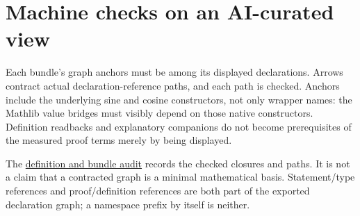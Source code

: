 \section{Machine checks on an AI-curated view}
Each bundle's graph anchors must be among its displayed declarations. Arrows
contract actual declaration-reference paths, and each path is checked.
Anchors include the underlying sine and cosine constructors, not only wrapper
names: the Mathlib value bridges must visibly depend on those native
constructors. Definition readbacks and explanatory companions do not become
prerequisites of the measured proof terms merely by being displayed.

The \href{three-proofs/definition-audit.json}{definition and bundle audit}
records the checked closures and paths. It is not a claim that a contracted
graph is a minimal mathematical basis. Statement/type references and
proof/definition references are both part of the exported declaration graph;
a namespace prefix by itself is neither.
